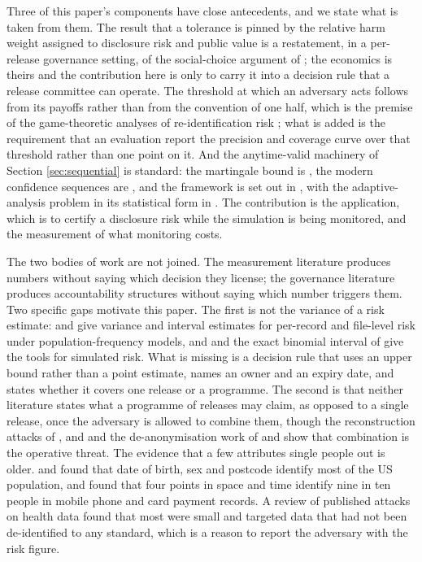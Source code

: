 \documentclass[11pt,a4paper]{article}
\theoremstyle{plain}
\theoremstyle{definition}
\theoremstyle{definition}
\theoremstyle{plain}
\begin{document}
Three of this paper's components have close antecedents, and we state what is
taken from them. The result that a tolerance is pinned by the
relative harm weight assigned to disclosure risk and public value is a restatement,
in a per-release governance setting, of the social-choice argument of
\citet{abowd2019}; the economics is theirs and the contribution here is only to
carry it into a decision rule that a release committee can operate. The threshold
at which an adversary acts follows from its payoffs rather than from the
convention of one half, which is the premise of the game-theoretic analyses of
re-identification risk \citep{wan2015}; what is added is the requirement that an
evaluation report the precision and coverage curve over that threshold rather
than one point on it. And the anytime-valid machinery of Section
\ref{sec:sequential} is standard: the martingale bound is \citet{ville1939}, the
modern confidence sequences are \citet{howard2021}, and the framework is set out
in \citet{ramdas2023}, with the adaptive-analysis problem in its statistical form
in \citet{dwork2015}. The contribution is the application, which is to certify a
disclosure risk while the simulation is being monitored, and the measurement of
what monitoring costs.

The two bodies of work are not joined. The measurement literature produces
numbers without saying which decision they license; the governance literature
produces accountability structures without saying which number triggers them. Two specific gaps motivate this paper. The first is not the
variance of a risk estimate: \citet{skinner2008} and \citet{rinott2006} give
variance and interval estimates for per-record and file-level risk under
population-frequency models, and \citet{brown2001} and the exact binomial
interval of \citet{clopper1934} give the tools for simulated risk. What is
missing is a decision rule that uses an upper bound rather than a point
estimate, names an owner and an expiry date, and states whether it covers one
release or a programme. The second is that neither literature states
what a programme of releases may claim, as opposed to a single release, once the
adversary is allowed to combine them, though the reconstruction attacks of
\citet{dinur2003}, \citet{garfinkel2019} and \citet{dick2023} and the
de-anonymisation work of \citet{narayanan2008} and \citet{rocher2019} show that
combination is the operative threat. The evidence that a few attributes single
people out is older. \citet{sweeney2000} and \citet{golle2006} found that date
of birth, sex and postcode identify most of the US population, and
\citet{demontjoye2013,demontjoye2015} found that four points in space and time
identify nine in ten people in mobile phone and card payment records. A review
of published attacks on health data \citep{elemam2011} found that most were
small and targeted data that had not been de-identified to any standard, which
is a reason to report the adversary with the risk figure.
\end{document}
